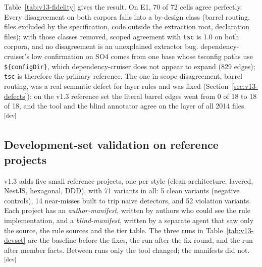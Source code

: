 \documentclass[10pt,a4paper]{article}
\newcommand{\devset}{\textsuperscript{\textsf{\tiny[dev]}}}
\newcommand{\dc}{dependency-cruiser}
\begin{document}
Table~\ref{tab:v13-fidelity} gives the result. On E1, 70 of 72 cells agree perfectly. Every disagreement on both
corpora falls into a by-design class (barrel routing, files excluded by the specification, code outside the
extraction root, declaration files); with those classes removed, scoped agreement with \texttt{tsc} is 1.0 on both
corpora, and no disagreement is an unexplained extractor bug. \dc{}'s low confirmation on SO4 comes from one base
whose tsconfig paths use \texttt{\$\{configDir\}}, which \dc{} does not appear to expand (829 edges); \texttt{tsc} is
therefore the primary reference. %
The one in-scope disagreement, barrel routing, was a real semantic defect for layer rules and was fixed
(Section~\ref{sec:v13-defects}): on the v1.3 reference set the literal barrel edges went from 0 of 18 to 18 of 18,
and the tool and the blind annotator agree on the layer of all 2014 files. \devset{}

\subsection{Development-set validation on reference projects}\label{sec:v13-devset}

v1.3 adds five small reference projects, one per style (clean architecture, layered, NestJS, hexagonal, DDD), with 71
variants in all: 5 clean variants (negative controls), 14 near-misses built to trip naive detectors, and 52
violation variants. Each project has an \emph{author-manifest}, written by authors who could see the rule
implementation, and a \emph{blind-manifest}, written by a separate agent that saw only the source, the rule sources
and the tier table. %
The three runs in Table~\ref{tab:v13-devset} are the baseline before the fixes, the run after the fix round, and the
run after member facts. Between runs only the tool changed; the manifests did not. \devset{}
\end{document}
